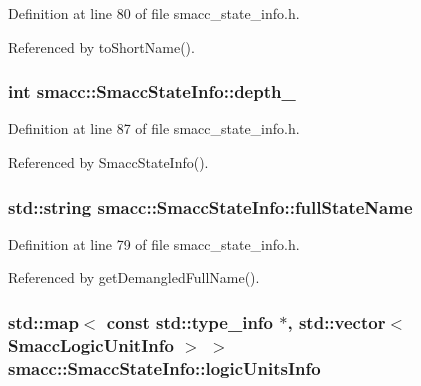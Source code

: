 Definition at line 80 of file smacc\+\_\+state\+\_\+info.\+h.



Referenced by to\+Short\+Name().

\subsubsection[{\texorpdfstring{depth\+\_\+}{depth_}}]{\setlength{\rightskip}{0pt plus 5cm}int smacc\+::\+Smacc\+State\+Info\+::depth\+\_\+}\hypertarget{classsmacc_1_1SmaccStateInfo_a3f44d5af069d0f37ed63b3101b330a65}{}\label{classsmacc_1_1SmaccStateInfo_a3f44d5af069d0f37ed63b3101b330a65}


Definition at line 87 of file smacc\+\_\+state\+\_\+info.\+h.



Referenced by Smacc\+State\+Info().

\subsubsection[{\texorpdfstring{full\+State\+Name}{fullStateName}}]{\setlength{\rightskip}{0pt plus 5cm}std\+::string smacc\+::\+Smacc\+State\+Info\+::full\+State\+Name}\hypertarget{classsmacc_1_1SmaccStateInfo_a3d9d81ebeda351fba21665bb7b9ff148}{}\label{classsmacc_1_1SmaccStateInfo_a3d9d81ebeda351fba21665bb7b9ff148}


Definition at line 79 of file smacc\+\_\+state\+\_\+info.\+h.



Referenced by get\+Demangled\+Full\+Name().

\subsubsection[{\texorpdfstring{logic\+Units\+Info}{logicUnitsInfo}}]{\setlength{\rightskip}{0pt plus 5cm}std\+::map$<$ const std\+::type\+\_\+info $\ast$, std\+::vector$<$ {\bf Smacc\+Logic\+Unit\+Info} $>$ $>$ smacc\+::\+Smacc\+State\+Info\+::logic\+Units\+Info\hspace{0.3cm}{\ttfamily [static]}}\hypertarget{classsmacc_1_1SmaccStateInfo_a7a22f3c1ea22042a19f897db4ecfeb67}{}\label{classsmacc_1_1SmaccStateInfo_a7a22f3c1ea22042a19f897db4ecfeb67}


